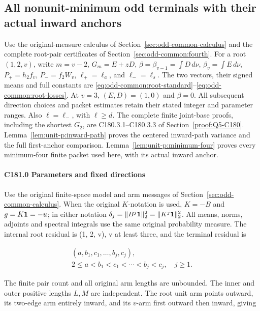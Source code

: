 \subsection{All nonunit-minimum odd terminals with their actual inward anchors}\label{proof:Q5-C181}
Use the original-measure calculus of
Section~\ref{sec:odd-common-calculus} and the complete root-pair
certificates of Section~\ref{sec:odd-common:fourth}.
For a root \((1,2,v)\), write \(m=v-2\), \(G_m=E+zD\),
\(\beta=\beta_{v-1}=\int D\,d\nu\),
\(\beta_v=\int E\,d\nu\),
\(P_+=h_2f_v\), \(P_-=\bar f_2W_v\),
\(\ell_+=\ell_a\), and \(\ell_-=\ell_s\).
The two vectors, their signed means and full constants are
\eqref{eq:odd-common:root-standard}--\eqref{eq:odd-common:root-losses}.
At \(v=3\), \((E,D)=(1,0)\) and \(\beta=0\).
All subsequent direction choices and packet estimates retain their
stated integer and parameter ranges.
Also $\ell=\ell_-$, with $\ell\ge d$. The complete finite joint-base proofs, including the shortest $G_2$, are C180.3.1--C180.3.3 of Section~\ref{proof:Q5-C180}. Lemma~\ref{lem:unit-p:inward-path} proves the centered inward-path variance and the full first-anchor comparison. Lemma~\ref{lem:unit-p:minimum-four} proves every minimum-four finite packet used here, with its actual inward anchor.
\paragraph{C181.0 Parameters and fixed directions}

Use the original finite-space model and arm messages of
Section~\ref{sec:odd-common-calculus}.
When the original \(K\)-notation is used, \(K=-B\) and
\(g=K\mathbf1=-u\); in either notation
\(\delta_j=\|B^j\mathbf1\|_2^2=\|K^j\mathbf1\|_2^2\).
All means, norms, adjoints and spectral integrals use the same
original probability measure.
The internal root residual is (1, 2, v), v at least three, and the terminal residual is

\[
\begin{gathered}
(a,b_1,c_1,\ldots,b_j,c_j),\qquad\\
2\le a<b_1<c_1<\cdots<b_j<c_j,\quad j\ge1.
\end{gathered}\tag{C181.T190.1}
\]

The finite pair count and all original arm lengths are unbounded. The inner and outer positive lengths \(L,\allowbreak \allowbreak  M\) are independent. The root unit arm points outward, its two-edge arm entirely inward, and its \(v\)-arm first outward then inward, giving

